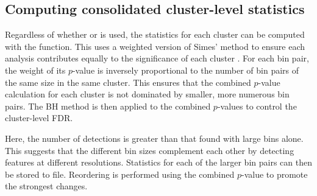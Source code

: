 \documentclass{report}\usepackage[]{graphicx}\usepackage[usenames,dvipsnames]{color}
\newcommand{\hlnum}[1]{\textcolor[rgb]{0.816,0.125,0.439}{#1}}%
\newcommand{\hlopt}[1]{\textcolor[rgb]{0,0,0}{#1}}%
\newcommand{\hlstd}[1]{\textcolor[rgb]{0.251,0.251,0.251}{#1}}%
\newcommand{\hlkwb}[1]{\textcolor[rgb]{0,0,0}{#1}}%
\newcommand{\hlkwd}[1]{\textcolor[rgb]{0.878,0.439,0.125}{#1}}%
\newenvironment{knitrout}{}{} %
\begin{document}
\subsection{Computing consolidated cluster-level statistics}
Regardless of whether  or  is used, the statistics for each cluster can be computed with the  function.
This uses a weighted version of Simes' method to ensure each analysis contributes equally to the significance of each cluster \cite{benjamini1997multiple}.
For each bin pair, the weight of its $p$-value is inversely proportional to the number of bin pairs of the same size in the same cluster. 
This ensures that the combined $p$-value calculation for each cluster is not dominated by smaller, more numerous bin pairs.
The BH method is then applied to the combined $p$-values to control the cluster-level FDR.

\begin{knitrout}
\color{fgcolor}
\end{knitrout}

Here, the number of detections is greater than that found with large bins alone.
This suggests that the different bin sizes complement each other by detecting features at different resolutions.
Statistics for each of the larger bin pairs can then be stored to file. 
Reordering is performed using the combined $p$-value to promote the strongest changes.
\end{document}
